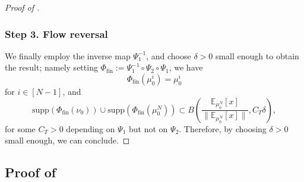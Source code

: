\documentclass[a4paper,11pt]{article}
\theoremstyle{plain}
\newcommand{\supp}{\mathrm{supp}}
\numberwithin{equation}{section}
\begin{document}
\begin{proof}[Proof of ]
\subsubsection*{Step 3. Flow reversal}

We finally employ the inverse map $\Psi_{1}^{-1}$, and choose $\delta>0$ small enough to obtain the result; namely setting $\Phi_{\text{fin}}:=\Psi_1^{-1}\circ\Psi_2\circ\Psi_1$, 
we have
\begin{equation*}
    \Phi_{\text{fin}}(\mu_0^i)=\mu_0^i
\end{equation*}
for $i\in[N-1]$, and
\begin{equation*}
    \supp(\Phi_{\text{fin}}(\nu_0))\cup\supp(\Phi_{\text{fin}}(\mu_0^N))\subset B\left( \frac{\mathbb{E}_{\mu_0^N}[x]}{\|\mathbb{E}_{\mu_0^N}[x]\|} , C_T\delta\right),
\end{equation*}
for some $C_T>0$ depending on $\Psi_1$ but not on $\Psi_2$. Therefore, by choosing $\delta>0$ small enough, we can conclude.
\end{proof}

\subsection{\texorpdfstring{Proof of }{Proof of Lemma}}
\label{proof: perturbation}
\end{document}
